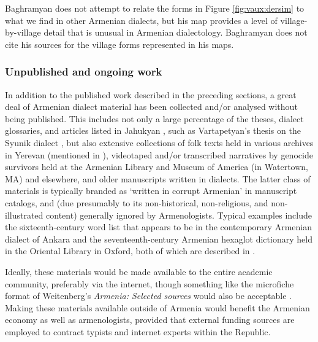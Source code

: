 \documentclass[output=paper]{langscibook}
\begin{document}
Baghramyan does not attempt to relate the forms in Figure \ref{fig:vaux:dersim} to what we find in other Armenian dialects, but his map provides a level of village-by-village detail that is unusual in Armenian dialectology.  Baghramyan does not cite his sources for the village forms represented in his maps. 

\subsubsection{Unpublished and ongoing work}\label{sec:vaux:documentation:arm:unpublish}

In addition to the published work described in the preceding sections, a great deal of Armenian dialect material has been collected and/or analysed without being published. This includes not only a large percentage of the theses, dialect glossaries, and articles listed in  Jahukyan \citep{Jahukyan-1972-ArmenianDiaolectology}, such as  Vartapetyan's  thesis on the Syunik dialect \citep{Vartapetyan-1961-Syunik,Vartapetyan-1962-Syunik}, but also extensive collections of folk texts held in various archives in Yerevan (mentioned in \citealt{Abeghyan-1940-Games,Ghanalanyan-1960-Sayings,Harutyunyan-1965-Riddles}), videotaped and/or transcribed narratives by genocide survivors held at the Armenian Library and Museum of America (in Watertown, MA) and elsewhere,  and older manuscripts written in dialects. The latter class of materials is typically branded as  `written in corrupt Armenian'  in manuscript catalogs, and (due presumably to its non-historical, non-religious, and non-illustrated content) generally ignored by Armenologists. Typical examples include the sixteenth-century word list that appears to be in the contemporary Armenian dialect of Ankara and the seventeenth-century Armenian hexaglot dictionary held in the Oriental Library in Oxford, both of which are described in \citet{BaronianConybeare-1918-CatalogueArmenianmanuscriptsBodleianLibrary}. 


Ideally, these materials would be made available to the entire academic community, preferably via the internet, though something like the microfiche format of  Weitenberg's \textit{Armenia: Selected sources}  would also be acceptable \citep{Weitenberg-1980-ArmeniaSelectedsourcesmicrofiche}. Making these materials available outside of Armenia would benefit the Armenian economy as well as armenologists, provided that external funding sources are employed to contract typists and internet experts within the Republic.
\end{document}
